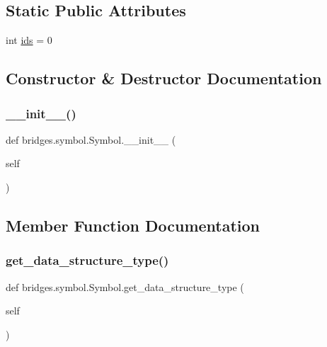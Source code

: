 \subsection*{Static Public Attributes}
\begin{DoxyCompactItemize}
\item 
int \mbox{\hyperlink{classbridges_1_1symbol_1_1_symbol_a505db07c4d1051cc45124ba8413a539b}{ids}} = 0
\end{DoxyCompactItemize}


\subsection{Constructor \& Destructor Documentation}
\mbox{\label{classbridges_1_1symbol_1_1_symbol_a57c7fcd41baccb9c2e15c9c828d957f6}} 
\subsubsection{\texorpdfstring{\+\_\+\+\_\+init\+\_\+\+\_\+()}{\_\_init\_\_()}}
{\footnotesize\ttfamily def bridges.\+symbol.\+Symbol.\+\_\+\+\_\+init\+\_\+\+\_\+ (\begin{DoxyParamCaption}\item[{}]{self }\end{DoxyParamCaption})}



\subsection{Member Function Documentation}
\mbox{\label{classbridges_1_1symbol_1_1_symbol_a0d68555d5ddfba992207249381c8f019}} 
\subsubsection{\texorpdfstring{get\+\_\+data\+\_\+structure\+\_\+type()}{get\_data\_structure\_type()}}
{\footnotesize\ttfamily def bridges.\+symbol.\+Symbol.\+get\+\_\+data\+\_\+structure\+\_\+type (\begin{DoxyParamCaption}\item[{}]{self }\end{DoxyParamCaption})}

